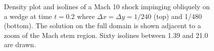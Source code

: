 \begin{figure}[h]
\begin{center}
\caption{\sf Density plot and isolines of a Mach 10 shock impinging 
obliquely on a wedge at time $t = 0.2$ where $\Delta x = \Delta y =
1/240$ (top) and 1/480 (bottom).
The solution on the full domain is shown adjacent to a zoom of the Mach 
stem region.  Sixty isolines between 1.39 and 21.0 are drawn.}\label{fig:dm}
\end{center}
\end{figure}

